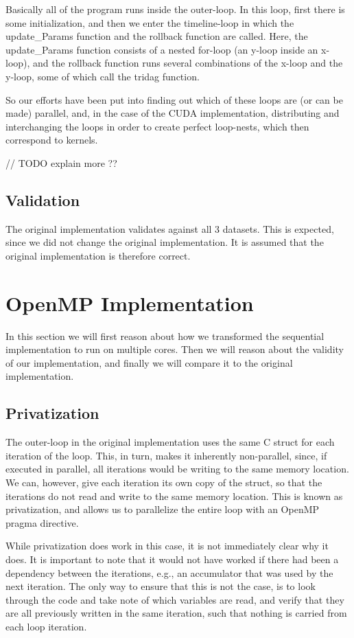 \documentclass[11pt]{article}
\begin{document}
Basically all of the program runs inside the outer-loop.
In this loop, first there is some initialization, and then we enter the timeline-loop in which the update\_Params function and the rollback function are called.
Here, the update\_Params function consists of a nested for-loop (an y-loop inside an x-loop), and the rollback function runs several combinations of the x-loop and the y-loop, some of which call the tridag function.

So our efforts have been put into finding out which of these loops are (or can be made) parallel, and, in the case of the CUDA implementation, distributing and interchanging the loops in order to create perfect loop-nests, which then correspond to kernels.

// TODO explain more ??

\subsection{Validation}
The original implementation validates against all 3 datasets. This is expected,
since we did not change the original implementation. It is assumed that the 
original implementation is therefore correct.


\section{OpenMP Implementation}
In this section we will first reason about how we transformed the sequential
implementation to run on multiple cores. Then we will reason about the validity 
of our implementation, and finally we will compare it to the original 
implementation.

\subsection{Privatization}
The outer-loop in the original implementation uses the same C 
struct for each
iteration of the loop. This, in turn, makes it inherently non-parallel, since,
if executed in parallel, all iterations would be writing to the same memory location. 
We can, however, give each iteration its own copy of the
struct, so that the iterations do not read and write to the same memory location. This is 
known as privatization, and allows us to parallelize the entire loop
with an OpenMP pragma directive. 

While privatization does work in this case, it is not immediately clear why it does. It is
important to note that it would not have worked if there had been a dependency between the iterations,
e.g., an accumulator that was used by the next iteration. The only way to ensure
that this is not the case, is to look through the code and take note of which 
variables are read, and verify that they are all previously written in the 
same iteration, such that nothing is carried from each loop iteration.
\end{document}
